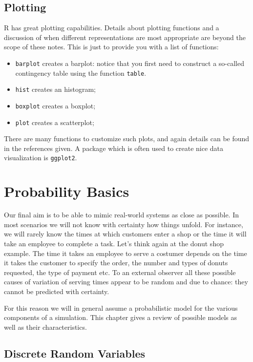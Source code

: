 \documentclass[
]{book}
\begin{document}
\hypertarget{plotting}{%
\section{Plotting}\label{plotting}}

R has great plotting capabilities. Details about plotting functions and a discussion of when different representations are most appropriate are beyond the scope of these notes. This is just to provide you with a list of functions:

\begin{itemize}
\item
  \texttt{barplot} creates a barplot: notice that you first need to construct a so-called contingency table using the function \texttt{table}.
\item
  \texttt{hist} creates an histogram;
\item
  \texttt{boxplot} creates a boxplot;
\item
  \texttt{plot} creates a scatterplot;
\end{itemize}

There are many functions to customize such plots, and again details can be found in the references given. A package which is often used to create nice data visualization is \texttt{ggplot2}.

\hypertarget{probability-basics}{%
\chapter{Probability Basics}\label{probability-basics}}

Our final aim is to be able to mimic real-world systems as close as possible. In most scenarios we will not know with certainty how things unfold. For instance, we will rarely know the times at which customers enter a shop or the time it will take an employee to complete a task. Let's think again at the donut shop example. The time it takes an employee to serve a costumer depends on the time it takes the customer to specify the order, the number and types of donuts requested, the type of payment etc. To an external observer all these possible causes of variation of serving times appear to be random and due to chance: they cannot be predicted with certainty.

For this reason we will in general assume a probabilistic model for the various components of a simulation. This chapter gives a review of possible models as well as their characteristics.

\hypertarget{discrete-random-variables}{%
\section{Discrete Random Variables}\label{discrete-random-variables}}
\end{document}

